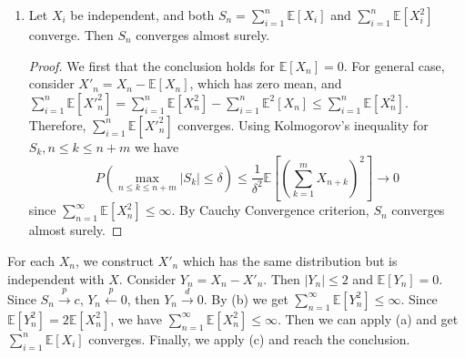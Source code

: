 \documentclass{article}
\begin{document}
\begin{enumerate}
\begin{enumerate}
\begin{proof}
        \end{proof}
        \item Let $X_i$ be independent,
        and both $S_n=\sum_{i=1}^{n} \mathbb{E}[X_i]$ and
        $\sum_{i=1}^{n} \mathbb{E}[X^2_i]$ converge.
        Then $S_n$ converges almost surely.
        \begin{proof}
            We first that the conclusion holds for $\mathbb{E}[X_n]=0$.
            For general case, consider $X'_n = X_n -\mathbb{E}[X_n]$, which has zero mean,
            and $\sum_{i=1}^n \mathbb{E}[X'^2_n] = \sum_{i=1}^n \mathbb{E}[X^2_n] - \sum_{i=1}^n \mathbb{E}^2[X_n]
            \leq \sum_{i=1}^n \mathbb{E}[X^2_n]$.
            Therefore, $\sum_{i=1}^n \mathbb{E}[X'^2_n]$
            converges.
            Using Kolmogorov's inequality for $S_k,  n \leq k \leq n+m$ we have
    $$
    P(\max_{n\leq k \leq n+m} |S_k| \leq \delta)
    \leq \frac{1}{\delta^2} \mathbb{E}[(\sum_{k=1}^{m} X_{n+k})^2] \to 0
    $$
    since $\sum_{n=1}^{\infty}\mathbb{E}[X^2_n] \leq \infty$.
    By Cauchy Convergence criterion, $S_n$ converges almost
    surely.
        \end{proof}
    \end{enumerate}
    For each $X_n$, we construct $X'_n$ which has the
    same distribution but is independent  with $X$.
    Consider $Y_n = X_n - X'_n$. Then $|Y_n| \leq 2$
    and $\mathbb{E}[Y_n]=0$.
    Since $S_n \xrightarrow{p} c$, $Y_n \xleftarrow{p} 0$, then $Y_n \xrightarrow{d} 0$.
    By (b) we get $\sum_{n=1}^{\infty}\mathbb{E}[Y^2_n] \leq \infty$. Since $\mathbb{E}[Y^2_n]=2\mathbb{E}[X^2_n]$,
    we have $\sum_{n=1}^{\infty}\mathbb{E}[X^2_n] \leq \infty$.
    Then we can apply (a) and get $ \sum_{i=1}^{n} \mathbb{E}[X_i]$ converges. Finally, we apply (c) and
    reach the conclusion.
\end{enumerate}
\end{document}
